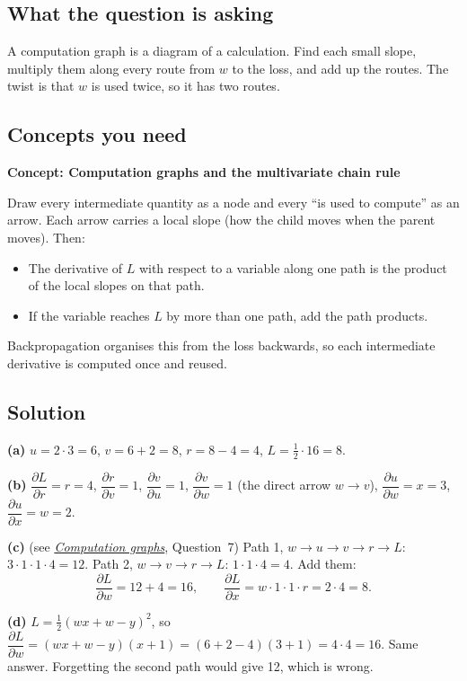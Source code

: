 \documentclass[12pt,a4paper]{article}
\newcommand{\concept}[2]{\par\medskip\phantomsection\label{#1}{\large\bfseries\color{blue!50!black} Concept: #2}\par}
\newcommand{\seeconcept}[3]{(see \hyperref[#1]{\textit{#2}}, Question~#3)}
\begin{document}
\subsection*{What the question is asking}
A computation graph is a diagram of a calculation. Find each small slope, multiply them along every route from $w$ to the loss, and add up the routes. The twist is that $w$ is used twice, so it has two routes.

\subsection*{Concepts you need}

\concept{c:graph}{Computation graphs and the multivariate chain rule}
Draw every intermediate quantity as a node and every ``is used to compute'' as an arrow. Each arrow carries a local slope (how the child moves when the parent moves). Then:
\begin{itemize}[nosep]
\item The derivative of $L$ with respect to a variable along one path is the product of the local slopes on that path.
\item If the variable reaches $L$ by more than one path, add the path products.
\end{itemize}
Backpropagation organises this from the loss backwards, so each intermediate derivative is computed once and reused.

\subsection*{Solution}
\textbf{(a)} $u=2\cdot3=6$, $v=6+2=8$, $r=8-4=4$, $L=\tfrac12\cdot16=8$.

\textbf{(b)} $\dfrac{\partial L}{\partial r}=r=4$, $\dfrac{\partial r}{\partial v}=1$, $\dfrac{\partial v}{\partial u}=1$, $\dfrac{\partial v}{\partial w}=1$ (the direct arrow $w\to v$), $\dfrac{\partial u}{\partial w}=x=3$, $\dfrac{\partial u}{\partial x}=w=2$.

\textbf{(c)} \seeconcept{c:graph}{Computation graphs}{7}
Path 1, $w\to u\to v\to r\to L$: $3\cdot1\cdot1\cdot4=12$. Path 2, $w\to v\to r\to L$: $1\cdot1\cdot4=4$. Add them:
\[
\frac{\partial L}{\partial w}=12+4=16,\qquad \frac{\partial L}{\partial x}=w\cdot1\cdot1\cdot r=2\cdot4=8 .
\]

\textbf{(d)} $L=\tfrac12(wx+w-y)^2$, so $\dfrac{\partial L}{\partial w}=(wx+w-y)(x+1)=(6+2-4)(3+1)=4\cdot4=16$. Same answer. Forgetting the second path would give 12, which is wrong.
\end{document}
